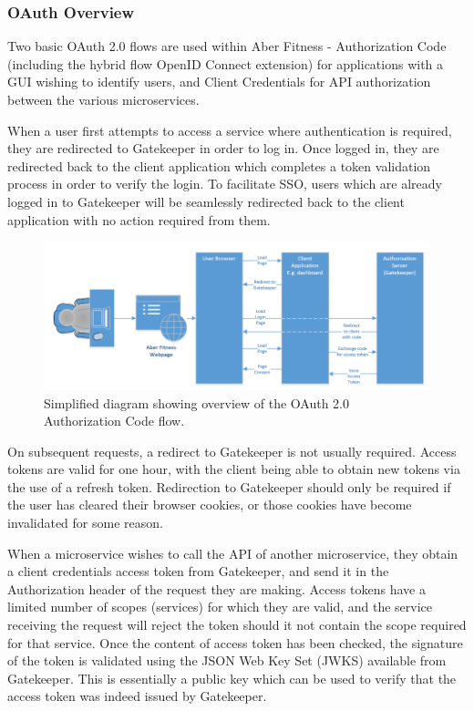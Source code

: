 \subsubsection{OAuth Overview}

Two basic OAuth 2.0 flows are used within Aber Fitness - Authorization Code (including the hybrid flow OpenID Connect extension) for applications with a GUI wishing to identify users, and Client Credentials for API authorization between the various microservices.

When a user first attempts to access a service where authentication is required, they are redirected to Gatekeeper in order to log in. Once logged in, they are redirected back to the client application which completes a token validation process in order to verify the login. To facilitate SSO, users which are already logged in to Gatekeeper will be seamlessly redirected back to the client application with no action required from them.

\begin{figure}[H]
    \centering
    \includegraphics[width=\textwidth]{Images/gatekeeper_authcode_flow.png}
    \caption{Simplified diagram showing overview of the OAuth 2.0 Authorization Code flow.}
\end{figure}

On subsequent requests, a redirect to Gatekeeper is not usually required. Access tokens are valid for one hour, with the client being able to obtain new tokens via the use of a refresh token. Redirection to Gatekeeper should only be required if the user has cleared their browser cookies, or those cookies have become invalidated for some reason.

When a microservice wishes to call the API of another microservice, they obtain a client credentials access token from Gatekeeper, and send it in the Authorization header of the request they are making. Access tokens have a limited number of scopes (services) for which they are valid, and the service receiving the request will reject the token should it not contain the scope required for that service. Once the content of access token has been checked, the signature of the token is validated using the JSON Web Key Set (JWKS) available from Gatekeeper. This is essentially a public key which can be used to verify that the access token was indeed issued by Gatekeeper.

